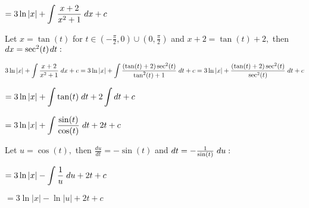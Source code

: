 \message{ !name(written11.tex)}\documentclass{article}
\begin{document}
 \begin{center}
  \( \displaystyle = 3\ln|x| + \int \frac{x+2}{x^2 + 1} \hspace{0.1cm} dx + c\)
 \end{center}
\vspace{0.3cm}
Let $x = \tan(t)$ for $t \in (-\frac{\pi}{2}, 0) \cup (0, \frac{\pi}{2})$ and $x + 2 = \tan(t) + 2,$ then $dx = \sec^2(t)\hspace{0.04cm}dt:$
\vspace{0.3cm}
\begin{center}
  \( \displaystyle 3\ln|x| + \int \frac{x+2}{x^2 + 1} \hspace{0.1cm} dx + c = 3\ln|x| + \int \frac{(\tan(t) + 2)\sec^2(t)}{\tan^2(t) + 1}\hspace{0.1cm}dt + c = 3\ln|x| + \frac{(\tan(t) + 2)\sec^2(t)}{\sec^2(t)}\hspace{0.1cm}dt + c\)
 \end{center}
 \begin{center}
  \( \displaystyle = 3\ln|x| + \int\tan(t) \hspace{0.1cm}dt + 2\int dt + c\) 
 \end{center}
 \begin{center}
  \( \displaystyle = 3\ln|x| + \int\frac{\sin(t)}{\cos(t)}\hspace{0.1cm}dt + 2t + c\) 
 \end{center}
 Let $u = \cos(t),$ then $\frac{du}{dt} = -\sin(t)$ and $dt = -\frac{1}{\sin(t)}\hspace{0.1cm} du:$
 \begin{center}
  \( \displaystyle = 3\ln|x| - \int\frac{1}{u} \hspace{0.1cm}du + 2t + c\) 
 \end{center}

 \begin{center}
  \( \displaystyle = 3\ln|x| - \ln|u| + 2t + c\) 
 \end{center}
\end{document}
